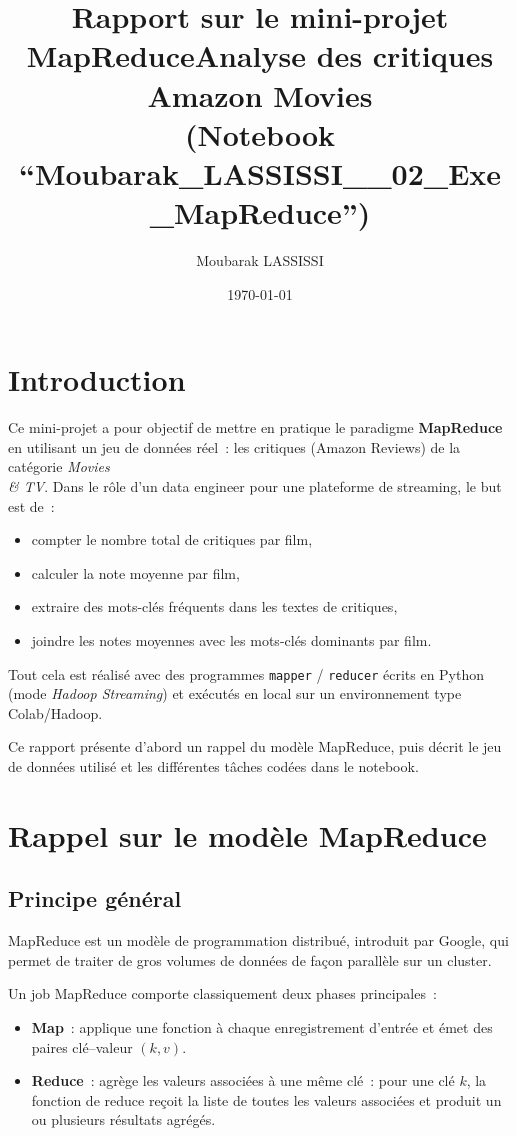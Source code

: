 \documentclass[a4paper,11pt]{article}
\title{Rapport sur le mini-projet MapReduce\newline Analyse des critiques Amazon Movies \\ (Notebook ``Moubarak\_LASSISSI\_\_02\_Exe\_MapReduce'')}
\author{Moubarak LASSISSI}
\date{\today}
\begin{document}
\maketitle

\tableofcontents

\section{Introduction}

Ce mini-projet a pour objectif de mettre en pratique le paradigme
\textbf{MapReduce} en utilisant un jeu de données réel~: les critiques
(Amazon Reviews) de la catégorie \emph{Movies \\& TV}. Dans le rôle
d'un data engineer pour une plateforme de streaming, le but est de~:
\begin{itemize}
  \item compter le nombre total de critiques par film,\
  \item calculer la note moyenne par film,\
  \item extraire des mots-clés fréquents dans les textes de critiques,\
  \item joindre les notes moyennes avec les mots-clés dominants par film.
\end{itemize}

Tout cela est réalisé avec des programmes \texttt{mapper} / \texttt{reducer}
écrits en Python (mode \emph{Hadoop Streaming}) et exécutés en local
sur un environnement type Colab/Hadoop.

Ce rapport présente d'abord un rappel du modèle MapReduce, puis décrit
le jeu de données utilisé et les différentes tâches codées dans le
notebook.

\section{Rappel sur le modèle MapReduce}

\subsection{Principe général}

MapReduce est un modèle de programmation distribué, introduit par Google,
qui permet de traiter de gros volumes de données de façon parallèle
sur un cluster.

Un job MapReduce comporte classiquement deux phases principales~:
\begin{itemize}
  \item \textbf{Map}~: applique une fonction à chaque enregistrement d'entrée
        et émet des paires clé--valeur \((k, v)\).\
  \item \textbf{Reduce}~: agrège les valeurs associées à une même clé~: pour
        une clé \(k\), la fonction de reduce reçoit la liste de toutes les
        valeurs associées et produit un ou plusieurs résultats agrégés.
\end{itemize}
\end{document}
